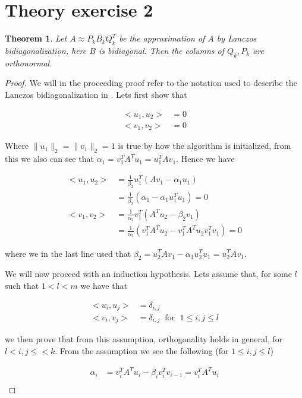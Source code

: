 \documentclass[11pt,a4paper,english]{elsarticle}%
\newtheorem{theorem}{Theorem}
\begin{document}
\section{Theory exercise 2}

\begin{theorem}
  Let $A \approx P_kB_kQ_k^T$ be the approximation of $A$ by Lanczos bidiagonalization, here $B$ is bidiagonal. Then the columns of $Q_k,P_k$ are orthonormal.
\end{theorem}

\begin{proof}
  We will in the proceeding proof refer to the notation used to describe the Lanczos bidiagonalization in \cite{Lanczos}. Lets first show that

  \begin{align*}
    <u_1,u_2> &= 0 \\
    <v_1,v_2> &= 0
  \end{align*}

  Where $\|u_1\|_2 = \|v_1\|_2 = 1$ is true by how the algorithm is initialized, from this we also can see that $\alpha_1 = v_1^TA^Tu_1 = u_1^TAv_1$. Hence we have


  \begin{align*}
    <u_1,u_2> &= \frac{1}{\beta_2}u_1^T(Av_1 - \alpha_1 u_1) \\
    &= \frac{1}{\beta_2} (\alpha_1 - \alpha_1u_1^Tu_1) = 0
    \\
    <v_1,v_2> &= \frac{1}{\alpha_2}v_1^T(A^Tu_2 - \beta_2 v_1) \\
    &= \frac{1}{\alpha_2}(v_1^TA^Tu_2 - v_1^TA^Tu_2v_1^Tv_1) = 0
  \end{align*}

  where we in the last line used that $\beta_2 = u_2^TAv_1 - \alpha_1u_2^Tu_1 = u_2^TAv_1$.

  We will now proceed with an induction hypothesis. Lets assume that, for some $l$ such that $1<l<m$ we have that

  \begin{align*}
    <u_i,u_{j}> &= \delta_{i,j} \\
    <v_i,v_{j}> &= \delta_{i,j} \; \; \text{for } \; 1 \leq i,j \leq l
  \end{align*}

  we then prove that from this assumption, orthogonality holds in general, for $l < i,j \leq < k$. From the assumption we see the following (for $1 \leq i,j \leq l$)

  \begin{align*}
    \alpha_i &= v_i^TA^Tu_i - \beta_i v_i^Tv_{i-1} = v_i^TA^Tu_i \\
  \end{align*}


\end{proof}
\end{document}
